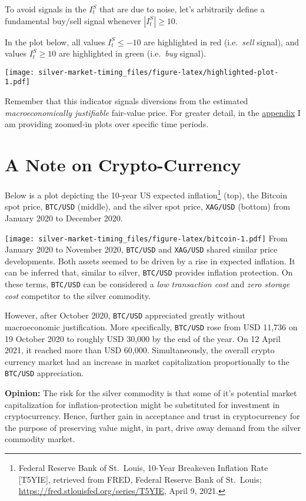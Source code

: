 \documentclass[
  12pt,
]{article}
\begin{document}
To avoid signals in the \(I^S_t\) that are due to noise, let's
arbitrarily define a fundamental buy/sell signal whenever
\(|I^S_t| \ge 10\).

In the plot below, all values \(I^S_t \leq -10\) are highlighted in red
(i.e.~\emph{sell} signal), and values \(I^S_t \geq 10\) are highlighted
in green (i.e.~\emph{buy} signal).

\texttt{[image: silver-market-timing\_files/figure-latex/highlighted-plot-1.pdf]}

Remember that this indicator signals diversions from the estimated
\emph{macroeconomically justifiable} fair-value price. For greater
detail, in the \protect\hyperlink{appendix-zoomed-plots}{appendix} I am
providing zoomed-in plots over specific time periods.

\hypertarget{a-note-on-crypto-currency}{%
\section{A Note on Crypto-Currency}\label{a-note-on-crypto-currency}}

Below is a plot depicting the 10-year US expected inflation\footnote{Federal
  Reserve Bank of St.~Louis, 10-Year Breakeven Inflation Rate
  {[}T5YIE{]}, retrieved from FRED, Federal Reserve Bank of St.~Louis;
  \url{https://fred.stlouisfed.org/series/T5YIE}, April 9, 2021.} (top),
the Bitcoin spot price, \texttt{BTC/USD} (middle), and the silver spot
price, \texttt{XAG/USD} (bottom) from January 2020 to December 2020.

\texttt{[image: silver-market-timing\_files/figure-latex/bitcoin-1.pdf]}
From January 2020 to November 2020, \texttt{BTC/USD} and
\texttt{XAG/USD} shared similar price developments. Both assets seemed
to be driven by a rise in expected inflation. It can be inferred that,
similar to silver, \texttt{BTC/USD} provides inflation protection. On
these terms, \texttt{BTC/USD} can be considered a \emph{low transaction
cost} and \emph{zero storage cost} competitor to the silver commodity.

However, after October 2020, \texttt{BTC/USD} appreciated greatly
without macroeconomic justification. More specifically, \texttt{BTC/USD}
rose from USD 11,736 on 19 October 2020 to roughly USD 30,000 by the end
of the year. On 12 April 2021, it reached more than USD 60,000.
Simultaneously, the overall crypto currency market had an increase in
market capitalization proportionally to the \texttt{BTC/USD}
appreciation.

\textbf{Opinion:} The risk for the silver commodity is that some of it's
potential market capitalization for inflation-protection might be
substituted for investment in cryptocurrency. Hence, further gain in
acceptance and trust in cryptocurrency for the purpose of preserving
value might, in part, drive away demand from the silver commodity
market.
\end{document}
